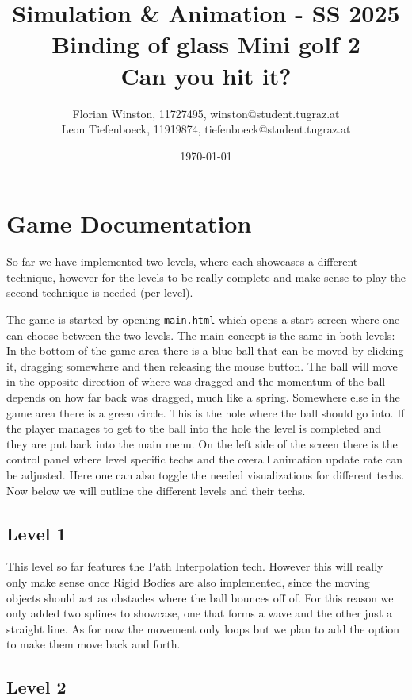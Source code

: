 \documentclass{article}
\title{	
	\large Simulation \& Animation - SS 2025\\
	\Huge{Binding of glass Mini golf 2}\\
	\huge{Can you hit it?}
}
\author{\parbox{\textwidth}{\centering
	Florian Winston, 11727495, winston@student.tugraz.at\\%
	Leon Tiefenboeck, 11919874, tiefenboeck@student.tugraz.at\\%
}}
\date{\today}
\begin{document}
\maketitle

\section{Game Documentation}

So far we have implemented two levels, where each showcases 
a different technique, however for the levels to be really complete and make sense to play the 
second technique is needed (per level). 

The game is started by opening \texttt{main.html} which opens a 
start screen where one can choose between the two levels. 
The main concept is the same in both levels: 
In the bottom of the game area there is a blue ball that can be moved 
by clicking it, dragging somewhere and then releasing the mouse button. 
The ball will move in the opposite direction of where was dragged and the momentum of the 
ball depends on how far back was dragged, much like a spring. 
Somewhere else in the game area there is a green circle. This is the hole where 
the ball should go into. If the player manages to get to the ball into the hole the level is completed 
and they are put back into the main menu. 
On the left side of the screen there is the control panel where level specific techs 
and the overall animation update rate can be adjusted. Here one can also toggle the needed visualizations 
for different techs. Now below we will outline the different levels and their techs. 

\subsection{Level 1}

This level so far features the Path Interpolation tech. However this will really only make sense 
once Rigid Bodies are also implemented, since the moving objects should act as obstacles where the 
ball bounces off of. For this reason we only added two splines to showcase, one that forms a wave and the other
just a straight line. As for now the movement only loops but we plan to add the option to 
make them move back and forth. 

\subsection{Level 2}
\end{document}
